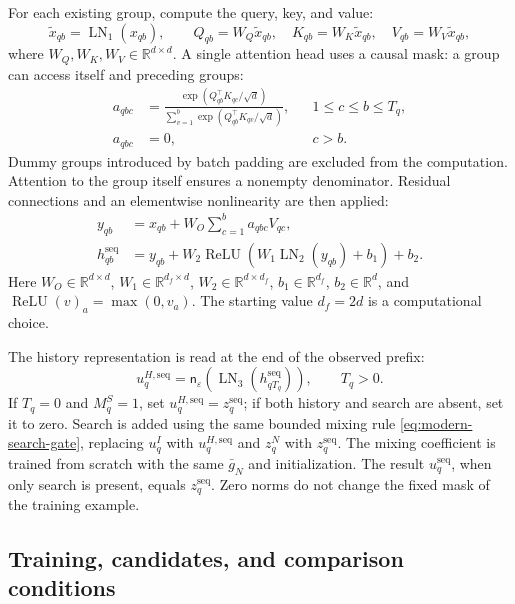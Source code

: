 \documentclass[12pt,a4paper]{article}
\newcommand{\R}{\mathbb R}
\newcommand{\eps}{\varepsilon}
\theoremstyle{plainru}
\begin{document}
For each existing group, compute the query, key, and value:
\begin{equation}\label{eq:sequence-qkv}
\tilde x_{qb}=\operatorname{LN}_1(x_{qb}),\qquad
Q_{qb}=W_Q\tilde x_{qb},\quad
K_{qb}=W_K\tilde x_{qb},\quad
V_{qb}=W_V\tilde x_{qb},
\end{equation}
where $W_Q,W_K,W_V\in\R^{d\times d}$.
A single attention head uses a causal mask: a group can access
itself and preceding groups:
\begin{align}\label{eq:sequence-attention}
a_{qbc}
&=\frac{\exp(Q_{qb}^{\top}K_{qc}/\sqrt d)}
{\sum_{v=1}^{b}\exp(Q_{qb}^{\top}K_{qv}/\sqrt d)},
&&1\le c\le b\le T_q,\\
a_{qbc}&=0,&&c>b.\nonumber
\end{align}
Dummy groups introduced by batch padding are excluded from the computation.
Attention to the group itself ensures a nonempty denominator.
Residual connections and an elementwise nonlinearity are then applied:
\begin{align}\label{eq:sequence-ffn}
y_{qb}&=x_{qb}+W_O\sum_{c=1}^{b}a_{qbc}V_{qc},\\
h_{qb}^{\mathrm{seq}}
&=y_{qb}
+W_2\operatorname{ReLU}\!\left(
W_1\operatorname{LN}_2(y_{qb})+b_1\right)+b_2.\nonumber
\end{align}
Here $W_O\in\R^{d\times d}$,
$W_1\in\R^{d_f\times d}$, $W_2\in\R^{d\times d_f}$,
$b_1\in\R^{d_f}$, $b_2\in\R^d$, and
$\operatorname{ReLU}(v)_a=\max(0,v_a)$.
The starting value $d_f=2d$ is a computational choice.

The history representation is read at the end of the observed prefix:
\begin{equation}\label{eq:sequence-readout}
u_q^{H,\mathrm{seq}}
=\mathsf n_\eps\!\left(
\operatorname{LN}_3(h_{qT_q}^{\mathrm{seq}})\right),
\qquad T_q>0.
\end{equation}
If $T_q=0$ and $M_q^S=1$, set
$u_q^{H,\mathrm{seq}}=z_q^{\mathrm{seq}}$;
if both history and search are absent, set it to zero.
Search is added using the same bounded mixing rule
\eqref{eq:modern-search-gate}, replacing $u_q^I$ with
$u_q^{H,\mathrm{seq}}$ and $z_q^N$ with $z_q^{\mathrm{seq}}$.
The mixing coefficient is trained from scratch with the same $\bar g_N$
and initialization. The result $u_q^{\mathrm{seq}}$, when only
search is present, equals $z_q^{\mathrm{seq}}$. Zero norms do not change
the fixed mask of the training example.

\subsection{Training, candidates, and comparison conditions}
\label{sec:sequence-training}
\end{document}
